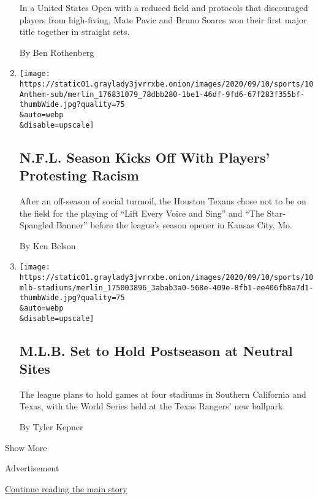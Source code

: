 \begin{enumerate}
  In a United States Open with a reduced field and protocols that
  discouraged players from high-fiving, Mate Pavic and Bruno Soares won
  their first major title together in straight sets.

  By Ben Rothenberg
\item
  \href{/2020/09/10/sports/nfl-anthem.html}{}

  \texttt{[image: https://static01.graylady3jvrrxbe.onion/images/2020/09/10/sports/10Anthem-sub/merlin\_176831079\_78dbb280-1be1-46df-9fd6-67f283f355bf-thumbWide.jpg?quality=75\\\&auto=webp\\\&disable=upscale]}

  \hypertarget{nfl-season-kicks-off-with-players-protesting-racism}{%
  \subsection{N.F.L. Season Kicks Off With Players' Protesting
  Racism}\label{nfl-season-kicks-off-with-players-protesting-racism}}

  After an off-season of social turmoil, the Houston Texans chose not to
  be on the field for the playing of ``Lift Every Voice and Sing'' and
  ``The Star-Spangled Banner'' before the league's season opener in
  Kansas City, Mo.

  By Ken Belson
\item
  \href{/2020/09/10/sports/baseball/mlb-postseason-neutral-sites.html}{}

  \texttt{[image: https://static01.graylady3jvrrxbe.onion/images/2020/09/10/sports/10mlb-stadiums/merlin\_175003896\_3abab3a0-568e-409e-8fb1-ee406fb8a7d1-thumbWide.jpg?quality=75\\\&auto=webp\\\&disable=upscale]}

  \hypertarget{mlb-set-to-hold-postseason-at-neutral-sites}{%
  \subsection{M.L.B. Set to Hold Postseason at Neutral
  Sites}\label{mlb-set-to-hold-postseason-at-neutral-sites}}

  The league plans to hold games at four stadiums in Southern California
  and Texas, with the World Series held at the Texas Rangers' new
  ballpark.

  By Tyler Kepner
\end{enumerate}

Show More

Advertisement

\protect\hyperlink{after-mid2}{Continue reading the main story}

